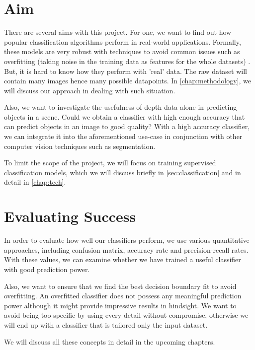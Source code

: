 \section{Aim}
There are several aims with this project. For one, we want to find out how popular classification algorithms perform in real-world applications. Formally, these models are very robust with techniques to avoid common issues such as overfitting (taking noise in the training data as features for the whole datasets) . But, it is hard to know how they perform with 'real' data. The raw dataset will contain many images hence many possible datapoints. In \autoref{chap:methodology}, we will discuss our approach in dealing with such situation.

Also, we want to investigate the usefulness of depth data alone in predicting objects in a scene. Could we obtain a classifier with high enough accuracy that can predict objects in an image to good quality? With a high accuracy classifier, we can integrate it into the aforementioned use-case in conjunction with other computer vision techniques such as segmentation. 

To limit the scope of the project, we will focus on training supervised classification models, which we will discuss briefly in \autoref{sec:classification} and in detail in \autoref{chap:tech}.

\section{Evaluating Success}
In order to evaluate how well our classifiers perform, we use various quantitative approaches, including confusion matrix, accuracy rate and precision-recall rates. With these values, we can examine whether we have trained a useful classifier with good prediction power. 

Also, we want to ensure that we find the best decision boundary fit to avoid overfitting. An overfitted classifier does not possess any meaningful prediction power although it might provide impressive results in hindsight. We want to avoid being too specific by using every detail without compromise, otherwise we will end up with a classifier that is tailored only the input dataset. 

We will discuss all these concepts in detail in the upcoming chapters.
